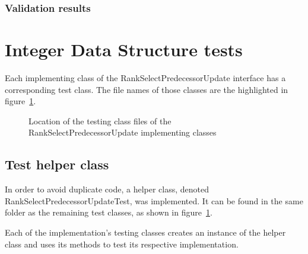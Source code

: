 \subsubsection{Validation results}

\begin{table}[H]
\centering

\caption{Validation summary of the Rank Lemma 1 function}
\label{tab:rankLemma1Validation}
\end{table}

\newpage
\section{Integer Data Structure tests} \label{sec:IntegerDataStructureTests}

Each implementing class of the {\ttfamily RankSelectPredecessorUpdate} interface has a corresponding test class. The file names of those classes are the highlighted in figure~\ref{fig:implementingClassesTestFilesTree}.

\begin{figure}[H]
    \caption{Location of the testing class files of the {\ttfamily RankSelectPredecessorUpdate} implementing classes}
    \label{fig:implementingClassesTestFilesTree}
\end{figure}

\subsection{Test helper class}

In order to avoid duplicate code, a helper class, denoted {\ttfamily RankSelectPredecessorUpdateTest}, was implemented. It can be found in the same folder as the remaining test classes, as shown in figure~\ref{fig:implementingClassesTestFilesTree}.

Each of the implementation's testing classes creates an instance of the helper class and uses its methods to test its respective implementation.

